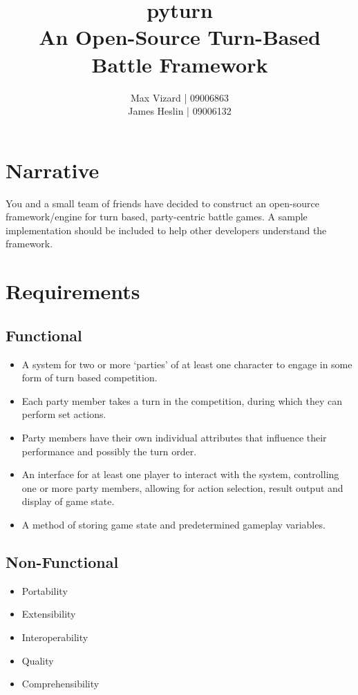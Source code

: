 \documentclass[11pt]{report}
\title{\textbf{pyturn}\\
An Open-Source Turn-Based Battle Framework}
\author{Max Vizard | 09006863\\
		James Heslin | 09006132\\}
\begin{document}
\maketitle

\section{Narrative}
You and a small team of friends have decided to construct an open-source framework/engine for turn based, party-centric battle games. A sample implementation should be included to help other developers understand the framework. 

\section{Requirements}
	\subsection{Functional}
	\begin{itemize}
			\item{A system for two or more ‘parties’ of at least one character to engage in some form of turn based competition.}
			\item{Each party member takes a turn in the competition, during which they can perform set actions.}
			\item{Party members have their own individual attributes that influence their performance and possibly the turn order.}
			\item{An interface for at least one player to interact with the system, controlling one or more party members, allowing for action selection, result output and display of game state.}
			\item{A method of storing game state and predetermined gameplay variables.}
	\end{itemize}
	\subsection{Non-Functional}
	\begin{itemize}
		\item{Portability}
		\item{Extensibility}
		\item{Interoperability}
		\item{Quality}
		\item{Comprehensibility}
	\end{itemize}
\end{document}
